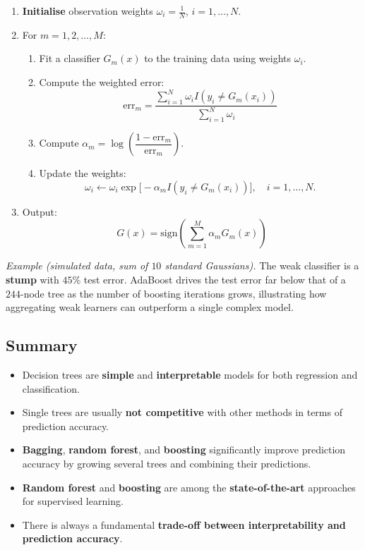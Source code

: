 \documentclass[11pt,a4paper]{article}
\theoremstyle{definition}
\theoremstyle{plain}
\theoremstyle{remark}
\begin{document}
\begin{tcolorbox}[colback=green!5!white,colframe=green!75!black,title=\textbf{AdaBoost.M1 Algorithm}]
\begin{enumerate}
    \item \textbf{Initialise} observation weights $\omega_i = \tfrac{1}{N}$, $i = 1, \ldots, N$.
    \item For $m = 1, 2, \ldots, M$:
    \begin{enumerate}
        \item Fit a classifier $G_m(x)$ to the training data using weights $\omega_i$.
        \item Compute the weighted error:
        \[
            \mathrm{err}_m = \frac{\sum_{i=1}^{N} \omega_i I(y_i \neq G_m(x_i))}{\sum_{i=1}^{N} \omega_i}
        \]
        \item Compute $\alpha_m = \log\!\left(\dfrac{1 - \mathrm{err}_m}{\mathrm{err}_m}\right)$.
        \item Update the weights:
        \[
            \omega_i \leftarrow \omega_i \exp\bigl[ -\alpha_m I(y_i \neq G_m(x_i)) \bigr], \quad i = 1, \ldots, N.
        \]
    \end{enumerate}
    \item Output:
    \[
        G(x) = \mathrm{sign}\!\left( \sum_{m=1}^{M} \alpha_m G_m(x) \right)
    \]
\end{enumerate}
\end{tcolorbox}

\textit{Example (simulated data, sum of $10$ standard Gaussians).} The weak classifier is a \textbf{stump} with $45\%$ test error. AdaBoost drives the test error far below that of a $244$-node tree as the number of boosting iterations grows, illustrating how aggregating weak learners can outperform a single complex model.

\subsection{Summary}

\begin{tcolorbox}[colback=green!5!white,colframe=green!75!black,title=\textbf{Tree-Based Methods: Key Takeaways}]
\begin{itemize}
    \item Decision trees are \textbf{simple} and \textbf{interpretable} models for both regression and classification.
    \item Single trees are usually \textbf{not competitive} with other methods in terms of prediction accuracy.
    \item \textbf{Bagging}, \textbf{random forest}, and \textbf{boosting} significantly improve prediction accuracy by growing several trees and combining their predictions.
    \item \textbf{Random forest} and \textbf{boosting} are among the \textbf{state-of-the-art} approaches for supervised learning.
    \item There is always a fundamental \textbf{trade-off between interpretability and prediction accuracy}.
\end{itemize}
\end{tcolorbox}
\end{document}
